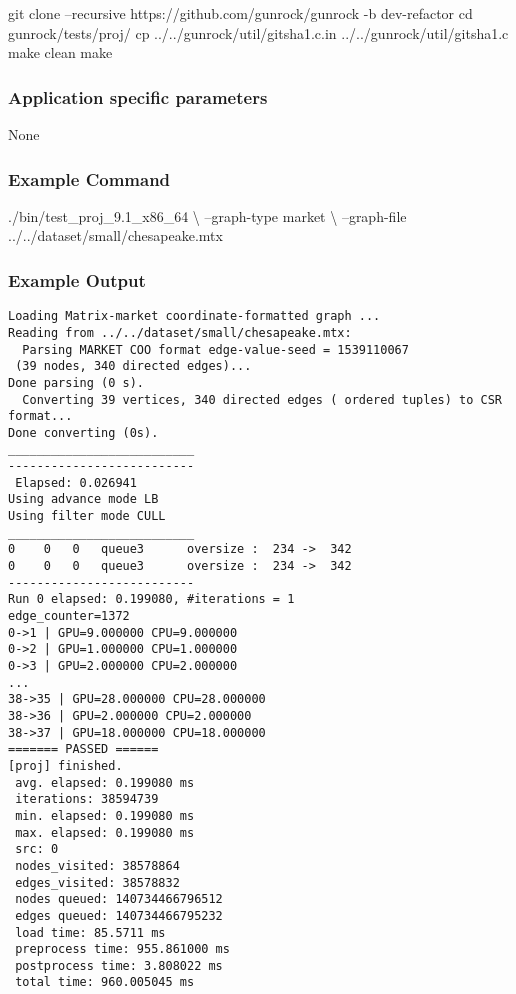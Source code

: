 \documentclass[10pt,oneside]{memoir}
\newenvironment{Shaded}{}{}
\newcommand{\BuiltInTok}[1]{#1}
\newcommand{\ExtensionTok}[1]{#1}
\newcommand{\FunctionTok}[1]{\textcolor[rgb]{0.02,0.16,0.49}{#1}}
\newcommand{\NormalTok}[1]{#1}
\begin{document}
\begin{Shaded}
\begin{Highlighting}[]
\FunctionTok{git}\NormalTok{ clone --recursive https://github.com/gunrock/gunrock -b dev-refactor}
\BuiltInTok{cd}\NormalTok{ gunrock/tests/proj/}
\FunctionTok{cp}\NormalTok{ ../../gunrock/util/gitsha1.c.in ../../gunrock/util/gitsha1.c}
\FunctionTok{make}\NormalTok{ clean}
\FunctionTok{make}
\end{Highlighting}
\end{Shaded}

\hypertarget{application-specific-parameters-2}{%
\subsubsection{Application specific
parameters}\label{application-specific-parameters-2}}

None

\hypertarget{example-command-4}{%
\subsubsection{Example Command}\label{example-command-4}}

\begin{Shaded}
\begin{Highlighting}[]
\ExtensionTok{./bin/test_proj_9.1_x86_64}\NormalTok{ \textbackslash{}}
\NormalTok{        --graph-type market \textbackslash{}}
\NormalTok{        --graph-file ../../dataset/small/chesapeake.mtx}
\end{Highlighting}
\end{Shaded}

\hypertarget{example-output-3}{%
\subsubsection{Example Output}\label{example-output-3}}

\begin{verbatim}
Loading Matrix-market coordinate-formatted graph ...
Reading from ../../dataset/small/chesapeake.mtx:
  Parsing MARKET COO format edge-value-seed = 1539110067
 (39 nodes, 340 directed edges)...
Done parsing (0 s).
  Converting 39 vertices, 340 directed edges ( ordered tuples) to CSR format...
Done converting (0s).
__________________________
--------------------------
 Elapsed: 0.026941
Using advance mode LB
Using filter mode CULL
__________________________
0    0   0   queue3      oversize :  234 ->  342
0    0   0   queue3      oversize :  234 ->  342
--------------------------
Run 0 elapsed: 0.199080, #iterations = 1
edge_counter=1372
0->1 | GPU=9.000000 CPU=9.000000
0->2 | GPU=1.000000 CPU=1.000000
0->3 | GPU=2.000000 CPU=2.000000
...
38->35 | GPU=28.000000 CPU=28.000000
38->36 | GPU=2.000000 CPU=2.000000
38->37 | GPU=18.000000 CPU=18.000000
======= PASSED ======
[proj] finished.
 avg. elapsed: 0.199080 ms
 iterations: 38594739
 min. elapsed: 0.199080 ms
 max. elapsed: 0.199080 ms
 src: 0
 nodes_visited: 38578864
 edges_visited: 38578832
 nodes queued: 140734466796512
 edges queued: 140734466795232
 load time: 85.5711 ms
 preprocess time: 955.861000 ms
 postprocess time: 3.808022 ms
 total time: 960.005045 ms
\end{verbatim}
\end{document}
